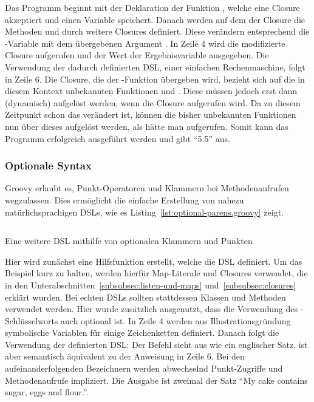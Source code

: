 \documentclass[a4paper]{article}
\newcommand{\outquote}[1]{``{#1}''}
\newcommand{\codelisting}[3]{\begin{listing}[htp]
	\inputminted{#1}{#1/#2}
	\vspace{-3ex}
	\caption{#3}
	\label{lst:#2}
\end{listing}}
\begin{document}
Das Programm beginnt mit der Deklaration der Funktion , welche eine Closure akzeptiert und einen Variable  speichert.
Danach werden auf dem  der Closure die Methoden  und  durch weitere Closures definiert.
Diese verändern entsprechend die -Variable mit dem übergebenen Argument .
In Zeile 4 wird die modifizierte Closure aufgerufen und der Wert der Ergebnisvariable ausgegeben.
Die Verwendung der dadurch definierten DSL, einer einfachen Rechenmaschine, folgt in Zeile 6.
Die Closure, die der -Funktion übergeben wird, bezieht sich auf die in diesem Kontext unbekannten Funktionen  und .
Diese müssen jedoch erst dann (dynamisch) aufgelöst werden, wenn die Closure aufgerufen wird.
Da zu diesem Zeitpunkt schon das  verändert ist, können die bisher unbekannten Funktionen nun über dieses aufgelöst werden, als hätte man  aufgerufen.
Somit kann das Programm erfolgreich ausgeführt werden und gibt \outquote{5.5} aus.

\subsubsection{Optionale Syntax}\label{subsubsec:optionale-syntax}

Groovy erlaubt es, Punkt-Operatoren und Klammern bei Methodenaufrufen wegzulassen.
Dies ermöglicht die einfache Erstellung von nahezu natürlichsprachigen DSLs, wie es Listing~\ref{lst:optional-parens.groovy} zeigt.

\codelisting{groovy}{optional-parens.groovy}{Eine weitere DSL mithilfe von optionalen Klammern und Punkten}

Hier wird zunächst eine Hilfsfunktion  erstellt, welche die DSL definiert.
Um das Beispiel kurz zu halten, werden hierfür Map-Literale und Closures verwendet, die in den Unterabschnitten~\ref{subsubsec:listen-und-maps} und~\ref{subsubsec:closures} erklärt wurden.
Bei echten DSLs sollten stattdessen Klassen und Methoden verwendet werden.
Hier wurde zusätzlich ausgenutzt, dass die Verwendung des -Schlüsselworts auch optional ist.
In Zeile 4 werden aus Illustrationsgründung symbolische Variablen für einige Zeichenketten definiert.
Danach folgt die Verwendung der definierten DSL:
Der Befehl sieht aus wie ein englischer Satz, ist aber semantisch äquivalent zu der Anweisung in Zeile 6.
Bei den aufeinanderfolgenden Bezeichnern werden abwechselnd Punkt-Zugriffe und Methodenaufrufe impliziert.
Die Ausgabe ist zweimal der Satz \outquote{My cake contains sugar, eggs and flour.}.
\end{document}
